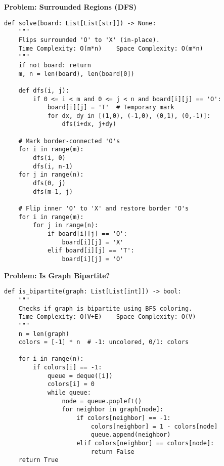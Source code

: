 \noindent\textbf{Problem: Surrounded Regions (DFS)}
\begin{verbatim}
def solve(board: List[List[str]]) -> None:
    """
    Flips surrounded 'O' to 'X' (in-place).
    Time Complexity: O(m*n)    Space Complexity: O(m*n)
    """
    if not board: return
    m, n = len(board), len(board[0])
    
    def dfs(i, j):
        if 0 <= i < m and 0 <= j < n and board[i][j] == 'O':
            board[i][j] = 'T'  # Temporary mark
            for dx, dy in [(1,0), (-1,0), (0,1), (0,-1)]:
                dfs(i+dx, j+dy)
    
    # Mark border-connected 'O's
    for i in range(m):
        dfs(i, 0)
        dfs(i, n-1)
    for j in range(n):
        dfs(0, j)
        dfs(m-1, j)
    
    # Flip inner 'O' to 'X' and restore border 'O's
    for i in range(m):
        for j in range(n):
            if board[i][j] == 'O':
                board[i][j] = 'X'
            elif board[i][j] == 'T':
                board[i][j] = 'O'
\end{verbatim}

\noindent\textbf{Problem: Is Graph Bipartite?}
\begin{verbatim}
def is_bipartite(graph: List[List[int]]) -> bool:
    """
    Checks if graph is bipartite using BFS coloring.
    Time Complexity: O(V+E)    Space Complexity: O(V)
    """
    n = len(graph)
    colors = [-1] * n  # -1: uncolored, 0/1: colors
    
    for i in range(n):
        if colors[i] == -1:
            queue = deque([i])
            colors[i] = 0
            while queue:
                node = queue.popleft()
                for neighbor in graph[node]:
                    if colors[neighbor] == -1:
                        colors[neighbor] = 1 - colors[node]
                        queue.append(neighbor)
                    elif colors[neighbor] == colors[node]:
                        return False
    return True
\end{verbatim}

